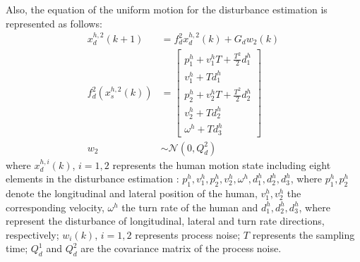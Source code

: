 \documentclass[journal]{IEEEtran}
\begin{document}
	Also, the equation of the uniform motion for the disturbance estimation is represented as follows:
	\begin{subequations}
		\begin{align*}
		x_d^{h,2}(k+1)&= f_d^2x_d^{h,2}(k)+G_dw_2(k) \label{eqn:h_d_dyn}\\
		f_d^2(x_s^{h,2}(k))&=\left[
		\begin{array}{c}
		p^h_1+v^h_1T+\frac{T^2}{2}d^h_1\\
		v^h_1+Td^h_1\\
		p^h_2+v^h_2T+\frac{T^2}{2}d^h_2\\
		v^h_2+Td^h_2\\
		\omega^h+Td^h_3  
		\end{array}\right] \\             
		w_2&\sim\mathcal{N}(0,Q^2_d)
		\end{align*}
	\end{subequations}\normalsize
	where $x_d^{h,i}(k)$, $i=1,2$ represents the human motion state including eight elements in the disturbance estimation : $p^h_1,v^h_1,p^h_2,v^h_2,\omega^h,d^h_1,d^h_2,d^h_3$, where $p^h_1,p^h_2$ denote the longitudinal and lateral position of the human, $v^h_1,v^h_2$ the corresponding velocity, $\omega^h$ the turn rate of the human and $d^h_1,d^h_2,d^h_3$, where represent the disturbance of longitudinal, lateral and turn rate directions, respectively; $w_i(k)$, $i=1,2$ represents process noise; $T$ represents the sampling time; $Q^1_d$ and $Q^2_d$ are the covariance matrix of the process noise.\\
	
\end{document}
